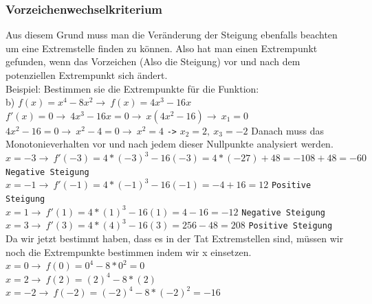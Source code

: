 \documentclass{article}
\begin{document}
	\subsubsection{Vorzeichenwechselkriterium}
	Aus diesem Grund muss man die Veränderung der Steigung ebenfalls beachten um eine Extremstelle finden zu können. Also hat man einen Extrempunkt gefunden, wenn das Vorzeichen (Also die Steigung) vor und nach dem potenziellen Extrempunkt sich ändert. \\
	Beispiel: Bestimmen sie die Extrempunkte für die Funktion: \\
	b) $f(x)=x^4-8x^2\to\ f(x)=4x^3-16x$ \\
	$f'(x)=0\to\ 4x^3-16x=0\to\ x(4x^2-16)\to\ x_1=0$ \\
	$4x^2-16=0\to\ x^2-4=0\to\ x^2=4$ \verb|->| $x_2=2,\ x_3=-2$ Danach muss das Monotonieverhalten vor und nach jedem dieser Nullpunkte analysiert werden. \\
	$x=-3\to\ f'(-3)=4*(-3)^3-16(-3)=4*(-27)+48=-108+48=-60$ \verb|Negative Steigung| \\
	$x=-1\to\ f'(-1)=4*(-1)^3-16(-1)=-4+16=12$ \verb|Positive Steigung| \\
	$x=1\to\ f'(1)=4*(1)^3-16(1)=4-16=-12$ \verb|Negative Steigung| \\
	$x=3\to\ f'(3)=4*(4)^3-16(3)=256-48=208$ \verb|Positive Steigung| \\
	Da wir jetzt bestimmt haben, dass es in der Tat Extremstellen sind, müssen wir noch die Extrempunkte bestimmen indem wir x einsetzen. \\
	$x=0\to\ f(0)=0^4-8*0^2=0$ \\
	$x=2\to\ f(2)=(2)^4-8*(2)$ \\
	$x=-2\to\ f(-2)=(-2)^4-8*(-2)^2=-16$ \\
\end{document}
